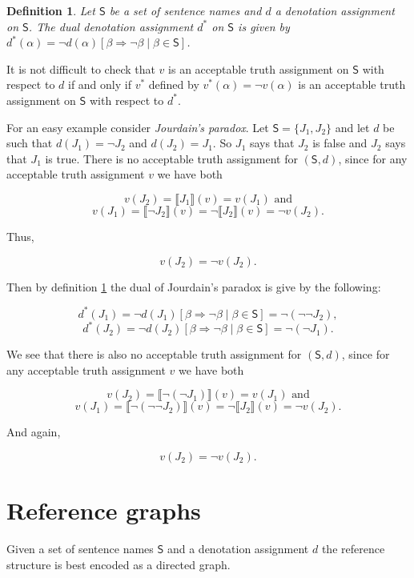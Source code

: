 \documentclass[12pt]{article}
\newtheorem{defn}{Definition}
\theoremstyle{remark}
\newcommand{\prg}{\hspace{0.25in}}
\def\S{\textsf{S}}
\begin{document}
\begin{defn}\label{dualdef}
Let $\S$ be a set of sentence names and $d$ a denotation assignment on $\S$.  The \emph{dual} denotation assignment $d^*$ on $\S$ is given by $d^*(\alpha) = \neg d(\alpha)[\beta \Rightarrow \neg \beta \mid \beta \in \S]$.
\end{defn}

It is not difficult to check that $v$ is an acceptable truth assignment on $\S$ with respect to $d$ if and only if $v^*$ defined by $v^*(\alpha) = \neg v(\alpha)$ is an acceptable truth assignment on $\S$ with respect to $d^*$.

\prg For an easy example consider \textit{Jourdain's paradox}. Let $\S = \{J_1, J_2\}$ and let $d$ be such that  $d(J_1) = \neg J_2$ and $d(J_2) = J_1$. So $J_1$ says that $J_2$ is false and $J_2$ says that $J_1$ is true. There is no acceptable truth assignment for $(\S, d)$, since for any acceptable truth assignment $v$ we have both

\[v(J_2) = \llbracket J_1 \rrbracket(v) = v(J_1) \text{   and}\]
\[v(J_1) = \llbracket \neg J_2 \rrbracket(v) = \neg \llbracket J_2 \rrbracket(v) = \neg v(J_2).\]

Thus,

\[v(J_2) = \neg v(J_2).\]

Then by definition \ref{dualdef} the dual of Jourdain's paradox is give by the following:

\[d^*(J_1) = \neg d(J_1)[\beta \Rightarrow \neg \beta \mid \beta \in \S] = \neg (\neg \neg J_2),\]
\[d^*(J_2) = \neg d(J_2)[\beta \Rightarrow \neg \beta \mid \beta \in \S] = \neg (\neg J_1).\]


We see that there is also no acceptable truth assignment for $(\S, d)$, since for any acceptable truth assignment $v$ we have both

\[v(J_2) = \llbracket \neg (\neg J_1) \rrbracket(v) = v(J_1) \text{   and}\]
\[v(J_1) = \llbracket \neg (\neg \neg J_2) \rrbracket(v) = \neg \llbracket J_2 \rrbracket(v) = \neg v(J_2).\]

And again,

\[v(J_2) = \neg v(J_2).\]

\section{Reference graphs}\label{sec2}

Given a set of sentence names $\S$ and a denotation assignment $d$ the reference structure is best encoded as a directed graph.
\end{document}
